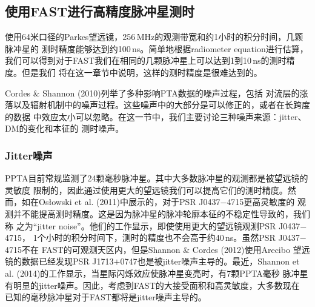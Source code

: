\subsection{使用FAST进行高精度脉冲星测时}

使用64米口径的Parkes望远镜，256\,MHz的观测带宽和约1小时的积分时间，几颗脉冲星的
测时精度能够达到约100\,ns\supercite{Manchester13}。简单地根据radiometer equation进行估算，
我们可以得到对于FAST我们在相同的几颗脉冲星上可以达到1到10\,ns的测时精度。但是我们
将在这一章节中说明，这样的测时精度是很难达到的。

Cordes \& Shannon (2010)\supercite{Cordes10}列举了多种影响PTA数据的噪声过程，包括
对流层的涨落以及辐射机制中的噪声过程。这些噪声中的大部分是可以修正的，或者在长跨度的数据
中效应太小可以忽略。在这一节中，我们主要讨论三种噪声来源：jitter、DM的变化和本征的
测时噪声。

\subsubsection{Jitter噪声}

PPTA目前常规监测了24颗毫秒脉冲星。其中大多数脉冲星的观测都是被望远镜的灵敏度
限制的，因此通过使用更大的望远镜我们可以提高它们的测时精度。然而，如在Os{\l}owski 
et al. (2011)\supercite{Oslowski11}中展示的，对于PSR J0437$-$4715更高灵敏度的
观测并不能提高测时精度。这是因为脉冲星的脉冲轮廓本征的不稳定性导致的，我们称
之为“jitter noise”。他们的工作显示，即使使用更大的望远镜观测PSR J0437$-$4715，
1个小时的积分时间下，测时的精度也不会高于约40\,ns。虽然PSR J0437$-$4715不在
FAST的可观测天区内，但是Shannon \& Cordes (2012)\supercite{Shannon12}使用Arecibo
望远镜的数据已经发现PSR J1713$+$0747也是被jitter噪声主导的。最近，Shannon et al. 
(2014)\supercite{Shannon14}的工作显示，当星际闪烁效应使脉冲星变亮时，有7颗PPTA毫秒
脉冲星有明显的jitter噪声。因此，考虑到FAST的大接受面积和高灵敏度，大多数现在
已知的毫秒脉冲星对于FAST都将是jitter噪声主导的。

